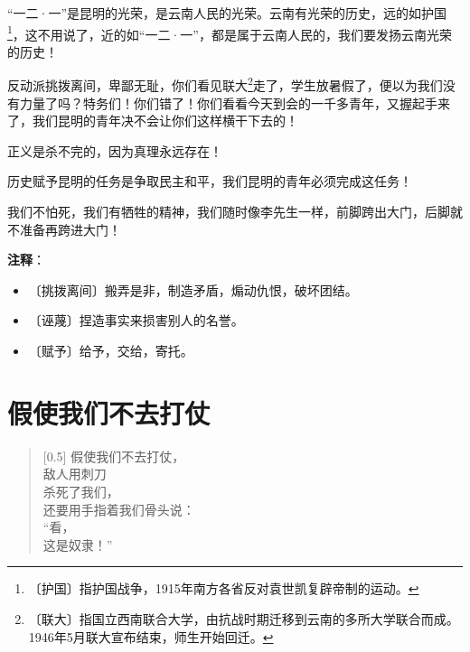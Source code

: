 \documentclass[12pt,UTF-8,openany]{ctexbook}
\begin{document}
\begin{normalsize}
    “一二·一”是昆明的光荣，是云南人民的光荣。云南有光荣的历史，远的如护国\footnote{〔护国〕指护国战争，1915年南方各省反对袁世凯复辟帝制的运动。}，这不用说了，近的如“一二·一”，都是属于云南人民的，我们要发扬云南光荣的历史！
    
    反动派挑拨离间，卑鄙无耻，你们看见联大\footnote{〔联大〕指国立西南联合大学，由抗战时期迁移到云南的多所大学联合而成。1946年5月联大宣布结束，师生开始回迁。}走了，学生放暑假了，便以为我们没有力量了吗？特务们！你们错了！你们看看今天到会的一千多青年，又握起手来了，我们昆明的青年决不会让你们这样横干下去的！
    
    正义是杀不完的，因为真理永远存在！
    
    历史赋予昆明的任务是争取民主和平，我们昆明的青年必须完成这任务！
    
    我们不怕死，我们有牺牲的精神，我们随时像李先生一样，前脚跨出大门，后脚就不准备再跨进大门！
    
\end{normalsize}


\newpage

\textbf{注释}：

\vspace{-1em}

\begin{itemize}
    \setlength\itemsep{-0.2em}
    \item 〔挑拨离间〕搬弄是非，制造矛盾，煽动仇恨，破坏团结。
    \item 〔诬蔑〕捏造事实来损害别人的名誉。
    \item 〔赋予〕给予，交给，寄托。
\end{itemize}

\chapter{假使我们不去打仗}

\begin{normalsize}
    
    \begin{verse}[0.5\linewidth]
        假使我们不去打仗， \\
        敌人用刺刀 \\
        杀死了我们， \\
        还要用手指着我们骨头说： \\
        “看， \\
        这是奴隶！”
    \end{verse}
    
\end{normalsize}
\end{document}

